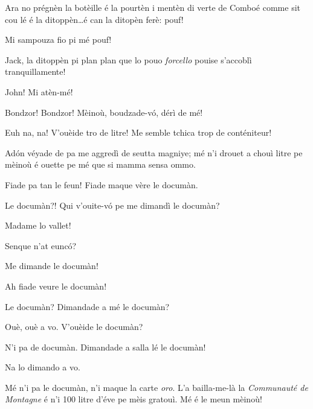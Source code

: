 \begin{drama}
\Jackspeaks Ara no prégnèn la botèille é la pourtèn i mentèn di verte de Comboé comme sit cou lé é la ditoppèn\ldots é can la ditopèn ferè: pouf!

\Prosperospeaks Mi sampouza fio pi mé pouf!

\Johnspeaks Jack, la ditoppèn pi plan plan que lo pouo \textit{forcello} pouise s'accoblì tranquillamente! 


\Jackspeaks John! Mi atèn-mé!


\scene[-- 1000 litre!]


\Naimaspeaks{} Bondzor!  Bondzor! Mèinoù, boudzade-v\'o, dérì de mé!

\Prosperospeaks Euh na, na! V'ouèide tro de litre! Me semble tchica trop de conténiteur!

\Naimaspeaks Ad\'on véyade de pa me aggredì de seutta magniye; mé n'i drouet a chouì litre pe mèinoù é ouette pe mé que si mamma sensa ommo.

\Prosperospeaks Fiade pa tan le feun! Fiade maque vère le documàn.

\Naimaspeaks Le documàn?! Qui v'ouite-v\'o pe me dimandì le documàn? 

\Prosperospeaks Madame lo vallet!


\Valletspeaks Senque n'at eunc\'o?

\Naimaspeaks Me dimande le documàn!

\Valletspeaks Ah fiade veure le documàn!

\Naimaspeaks Le documàn? Dimandade a mé le documàn?

\Valletspeaks Ouè, ouè a vo. V'ouèide le documàn?

\Naimaspeaks N'i pa de documàn. Dimandade a salla lé  le documàn!

\Valletspeaks Na lo dimando a vo.

\Naimaspeaks Mé n'i pa le documàn, n'i maque la carte \textit{oro}.  L'a bailla-me-là la \textit{Communauté de Montagne} é n'i 100 litre d'éve pe mèis gratouì. Mé é le meun mèinoù!


\end{drama}
